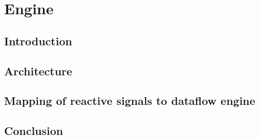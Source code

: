 \chapter{Engine}

\section{Introduction}

\section{Architecture}

\section{Mapping of reactive signals to dataflow engine}

\section{Conclusion}





